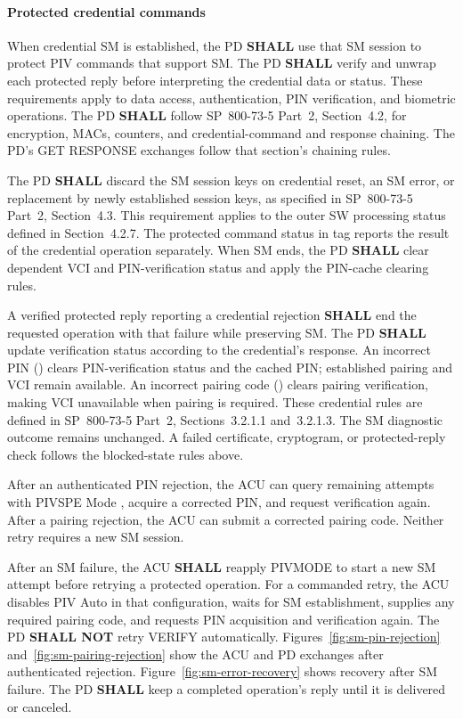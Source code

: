 \paragraph{Protected credential commands}
When credential SM is established, the PD \textbf{SHALL} use that SM session
to protect PIV commands that support SM. The PD \textbf{SHALL} verify and
unwrap each protected reply before interpreting the credential data or status.
These requirements apply to data access, authentication,
PIN verification, and biometric operations. The PD \textbf{SHALL} follow
SP~800-73-5 Part~2, Section~4.2, for encryption, MACs, counters, and credential-command
and response chaining. The PD's GET RESPONSE exchanges follow that
section's chaining rules.

The PD \textbf{SHALL} discard the SM session keys on credential reset, an SM
error, or replacement by newly established session keys, as specified in
SP~800-73-5 Part~2, Section~4.3. This requirement applies to the outer SW
processing status defined in Section~4.2.7. The protected command status in
tag  reports the result of the credential operation separately.
When SM ends, the PD \textbf{SHALL}
clear dependent VCI and PIN-verification status and apply the PIN-cache
clearing rules.

A verified protected reply reporting a credential rejection \textbf{SHALL}
end the requested operation with that failure while preserving SM. The PD
\textbf{SHALL} update verification status according to the credential's
response. An incorrect PIN () clears PIN-verification status
and the cached PIN; established pairing and VCI remain available. An incorrect
pairing code () clears pairing verification, making VCI unavailable
when pairing is required. These credential rules are defined in SP~800-73-5
Part~2, Sections~3.2.1.1 and~3.2.1.3. The SM diagnostic outcome remains
unchanged. A failed certificate, cryptogram, or protected-reply check follows
the blocked-state rules above.

After an authenticated PIN rejection, the ACU can query remaining attempts
with PIVSPE Mode , acquire a corrected PIN, and request verification
again. After a pairing rejection, the ACU can submit a corrected pairing code.
Neither retry requires a new SM session.

After an SM failure, the ACU \textbf{SHALL} reapply PIVMODE
to start a new SM attempt before retrying a protected operation.
For a commanded retry, the ACU disables PIV Auto
in that configuration, waits for SM establishment, supplies any required
pairing code, and requests PIN acquisition and verification again. The PD
\textbf{SHALL NOT} retry VERIFY automatically.
Figures~\ref{fig:sm-pin-rejection} and~\ref{fig:sm-pairing-rejection} show
the ACU and PD exchanges after authenticated rejection.
Figure~\ref{fig:sm-error-recovery} shows recovery after SM failure.
The PD \textbf{SHALL} keep a completed operation's reply until it is delivered
or canceled.

